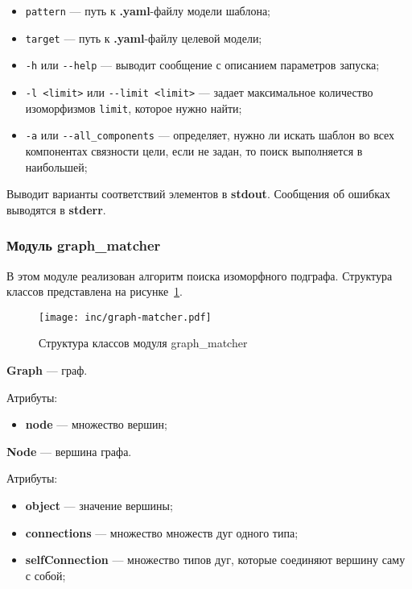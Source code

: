 \begin{itemize}
\item \verb;pattern; --- путь к \textbf{.yaml}-файлу модели шаблона;
\item \verb;target; --- путь к \textbf{.yaml}-файлу целевой модели;
\item \verb;-h; или \verb;--help; --- выводит сообщение с описанием параметров
запуска;
\item \verb;-l <limit>; или \verb;--limit <limit>; --- задает максимальное
количество изоморфизмов \verb;limit;, которое нужно найти;
\item \verb;-a; или \verb;--all_components; --- определяет, нужно ли искать
шаблон во всех компонентах связности цели, если не задан, то поиск выполняется
в наибольшей;
\end{itemize}

Выводит варианты соответствий элементов в \textbf{stdout}.
Сообщения об ошибках выводятся в \textbf{stderr}.

\subsubsection{Модуль graph\_matcher}

В этом модуле реализован алгоритм поиска изоморфного подграфа.
Структура классов представлена на рисунке~\ref{fig:graph-matcher}.

\begin{figure}[!ht]
\centering
\texttt{[image: inc/graph-matcher.pdf]}
\caption{Структура классов модуля graph\_matcher}
\label{fig:graph-matcher}
\end{figure}

\textbf{Graph} --- граф.

Атрибуты:
\begin{itemize}
\item \textbf{node} --- множество вершин;
\end{itemize}

\textbf{Node} --- вершина графа.

Атрибуты:
\begin{itemize}
\item \textbf{object} --- значение вершины;
\item \textbf{connections} --- множество множеств дуг одного типа;
\item \textbf{selfConnection} --- множество типов дуг, которые соединяют вершину саму с собой;
\end{itemize}

